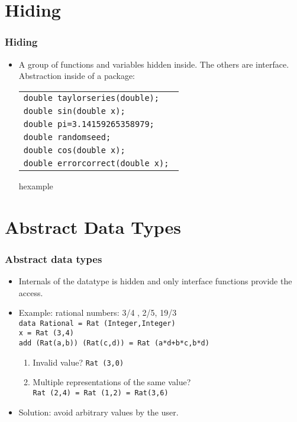 \section{Hiding}
\begin{frame}
 \frametitle{Hiding}
\begin{itemize}
 \item A group of functions and variables hidden inside. The others are interface.
Abstraction inside of a package:\\
{\scriptsize
\begin{tabular}{|>{\tt}l|} \hline
 \color{gray}double taylorseries(double);  		\\
 double sin(double x);			\\
 double pi=3.14159265358979;		\\
 \color{gray}double randomseed;	\\
 double cos(double x);			\\
 \color{gray}double errorcorrect(double x); \\ \hline
\end{tabular}}
\begin{beamercolorbox}{hexample}
 \codehideH
\end{beamercolorbox}

\end{itemize}
\end{frame}

\section{Abstract Data Types}
\begin{frame}
\frametitle{Abstract data types}
 \begin{itemize}
  \item Internals of the datatype is hidden and only interface functions provide the
  access.
  \item Example: rational numbers: 3/4 , 2/5,  19/3 \\
\texttt{data Rational = Rat (Integer,Integer) \\
x = Rat  (3,4)\\
add (Rat(a,b)) (Rat(c,d)) = Rat (a*d+b*c,b*d)} \begin{enumerate}
  \item \alert{Invalid value?}  \texttt{Rat (3,0)}
  \item \alert{Multiple representations of the same value?} \\ \texttt{Rat (2,4) = Rat (1,2)  = Rat(3,6)}
  \end{enumerate}
  \item Solution: avoid arbitrary values by the user.
 \end{itemize}
\end{frame}

